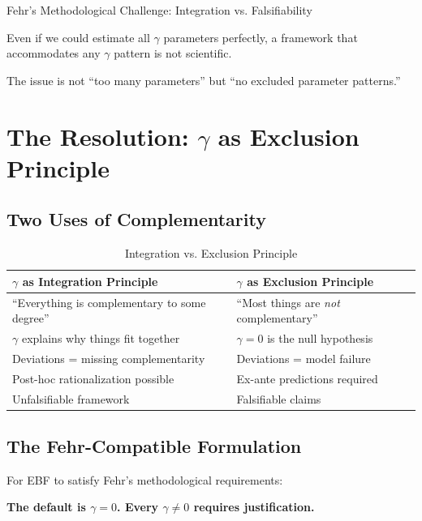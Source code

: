 \begin{chapter}{Fehr's Methodological Challenge: Integration vs. Falsifiability}
\begin{tcolorbox}[colback=gray!10!white,colframe=gray!75!black]
Even if we could estimate all $\gamma$ parameters perfectly, a framework that accommodates any $\gamma$ pattern is not scientific.

The issue is not ``too many parameters'' but ``no excluded parameter patterns.''
\end{tcolorbox}


\section{The Resolution: $\gamma$ as Exclusion Principle}
\label{sec:resolution}

\subsection{Two Uses of Complementarity}

\begin{table}[h]
\centering
\caption{Integration vs. Exclusion Principle}
\label{tab:integration-exclusion}
\renewcommand{\arraystretch}{1.4}
\begin{tabular}{@{}p{6cm}p{6cm}@{}}
\toprule
\textbf{$\gamma$ as Integration Principle} & \textbf{$\gamma$ as Exclusion Principle} \\
\midrule
``Everything is complementary to some degree'' & ``Most things are \textit{not} complementary'' \\
$\gamma$ explains why things fit together & $\gamma = 0$ is the null hypothesis \\
Deviations = missing complementarity & Deviations = model failure \\
Post-hoc rationalization possible & Ex-ante predictions required \\
Unfalsifiable framework & Falsifiable claims \\
\bottomrule
\end{tabular}
\end{table}

\subsection{The Fehr-Compatible Formulation}

For EBF to satisfy Fehr's methodological requirements:

\begin{tcolorbox}[colback=green!5!white,colframe=green!75!black,title=\textbf{Fehr-Compatible EBF Principle}]
\begin{center}
\large
\textbf{The default is $\gamma = 0$. Every $\gamma \neq 0$ requires justification.}
\end{center}


\end{tcolorbox}
\end{chapter}
